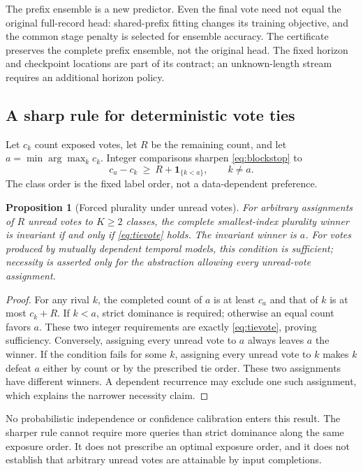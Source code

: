 \documentclass[11pt,a4paper]{article}
\newtheorem{proposition}[theorem]{Proposition}
\theoremstyle{definition}\newtheorem{definition}[theorem]{Definition}
\begin{document}
The prefix ensemble is a new predictor. Even the final vote need not equal the original full-record head: shared-prefix fitting changes its training objective, and the common stage penalty is selected for ensemble accuracy. The certificate preserves the complete prefix ensemble, not the original head. The fixed horizon and checkpoint locations are part of its contract; an unknown-length stream requires an additional horizon policy.

\subsection{A sharp rule for deterministic vote ties}
Let $c_k$ count exposed votes, let $R$ be the remaining count, and let $a=\min\arg\max_k c_k$. Integer comparisons sharpen \eqref{eq:blockstop} to
\begin{equation}
 c_a-c_k\ \ge\ R+\mathbf1_{\{k<a\}},\qquad k\ne a.
 \label{eq:tievote}
\end{equation}
The class order is the fixed label order, not a data-dependent preference.

\begin{proposition}[Forced plurality under unread votes]\label{prop:tievote}
For arbitrary assignments of $R$ unread votes to $K\ge2$ classes, the complete smallest-index plurality winner is invariant if and only if \eqref{eq:tievote} holds. The invariant winner is $a$. For votes produced by mutually dependent temporal models, this condition is sufficient; necessity is asserted only for the abstraction allowing every unread-vote assignment.
\end{proposition}
\begin{proof}
For any rival $k$, the completed count of $a$ is at least $c_a$ and that of $k$ is at most $c_k+R$. If $k<a$, strict dominance is required; otherwise an equal count favors $a$. These two integer requirements are exactly \eqref{eq:tievote}, proving sufficiency. Conversely, assigning every unread vote to $a$ always leaves $a$ the winner. If the condition fails for some $k$, assigning every unread vote to $k$ makes $k$ defeat $a$ either by count or by the prescribed tie order. These two assignments have different winners. A dependent recurrence may exclude one such assignment, which explains the narrower necessity claim.
\end{proof}

No probabilistic independence or confidence calibration enters this result. The sharper rule cannot require more queries than strict dominance along the same exposure order. It does not prescribe an optimal exposure order, and it does not establish that arbitrary unread votes are attainable by input completions.
\end{document}
